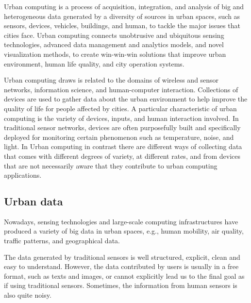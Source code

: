 Urban computing is a process of acquisition, integration, and analysis of big and heterogeneous data generated by a diversity of sources in urban spaces, such as sensors, devices, vehicles, buildings, and human, to tackle the major issues that cities face. Urban computing connects unobtrusive and ubiquitous sensing technologies, advanced data management and analytics models, and novel visualization methods, to create win-win-win solutions that improve urban environment, human life quality, and city operation systems.

Urban computing draws is related to the domains of wireless and sensor networks, information science, and human-computer interaction. Collections of devices are used to gather data about the urban environment to help improve the quality of life for people affected by cities. A particular characteristic of urban computing  is the variety of devices, inputs, and human interaction involved. In traditional sensor networks, devices are often purposefully built and specifically deployed for monitoring certain phenomenon such as temperature, noise, and light. In Urban computing in contrast there are different ways of collecting data that comes with different degrees of variety, at different rates, and from devices that are not necessarily aware that they contribute to urban computing applications.


\subsection{Urban data}

Nowadays, sensing technologies and large-scale computing infrastructures have produced a variety of big data in urban spaces, e.g., human mobility, air quality, traffic patterns, and geographical data.

The data generated by traditional sensors is well structured, explicit, clean and easy to understand. However, the data contributed by users is usually in a free format, such as texts and images, or cannot explicitly lead us to the final goal as if using traditional sensors. Sometimes, the information from human sensors is also quite noisy.

